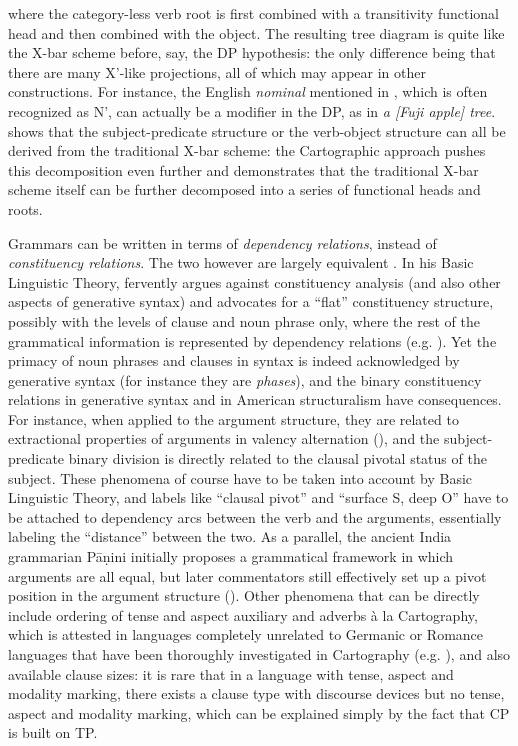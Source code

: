 \documentclass[UTF8, a4paper, oneside, scheme=plain, 12pt]{ctexrep}
\newcommand*{\citepage}[1]{p.~{#1}}
\newcommand*{\citepages}[1]{pp.~{#1}}
\newcommand*{\term}[1]{\emph{#1}}
\newcommand{\form}[1]{\emph{#1}}
\begin{document}
{{    where the category-less verb root is first combined with a transitivity functional head and then combined with the object.
    The resulting tree diagram is quite like the X-bar scheme before, say, the DP hypothesis:
    the only difference being that there are many X'-like projections, all of which may appear in other constructions.
    For instance, the English \term{nominal} mentioned in \citet{cgel}, which is often recognized as N', can actually be a modifier in the DP,
    as in \form{a [Fuji apple] tree}.
    \citet{deng2010} shows that the subject-predicate structure or the verb-object structure can all be derived from the traditional X-bar scheme:
    the Cartographic approach pushes this decomposition even further and demonstrates that the traditional X-bar scheme itself can be further decomposed into a series of functional heads and roots.
} 

Grammars can be written in terms of \emph{dependency relations}, instead of \emph{constituency relations}.
The two however are largely equivalent \citep{boston2009dependency}.
In his Basic Linguistic Theory, \citet{dixon2009basic} fervently argues against constituency analysis (and also other aspects of generative syntax) and advocates for a ``flat'' constituency structure, possibly with the levels of clause and noun phrase only,
where the rest of the grammatical information is represented by dependency relations 
(e.g. \citealt[\citepage{49}]{dixon2009basic}).
Yet the primacy of noun phrases and clauses in syntax is indeed acknowledged by generative syntax (for instance they are \term{phases}), and the binary constituency relations in generative syntax and in American structuralism have consequences.
For instance, when applied to the argument structure,
they are related to extractional properties of arguments in valency alternation (),
and the subject-predicate binary division is directly related to the clausal pivotal status of the subject.
These phenomena of course have to be taken into account by Basic Linguistic Theory,
and labels like ``clausal pivot'' and ``surface S, deep O'' have to be attached to dependency arcs between the verb and the arguments,
essentially labeling the ``distance'' between the two. 
As a parallel, the ancient India grammarian Pāṇini initially proposes a grammatical framework  in which arguments are all equal, but later commentators still effectively set up a pivot position in the argument structure ().
Other phenomena that can be directly include
ordering of tense and aspect auxiliary and adverbs à la Cartography, which is attested in languages completely unrelated to Germanic or Romance languages that have been thoroughly investigated in Cartography (e.g. \citealt[\citepages{166-167}]{grimm2021grammar}),
and also available clause sizes: it is rare that in a language with tense, aspect and modality marking,
there exists a clause type with discourse devices but no tense, aspect and modality marking,
which can be explained simply by the fact that CP is built on TP.

}
\end{document}
